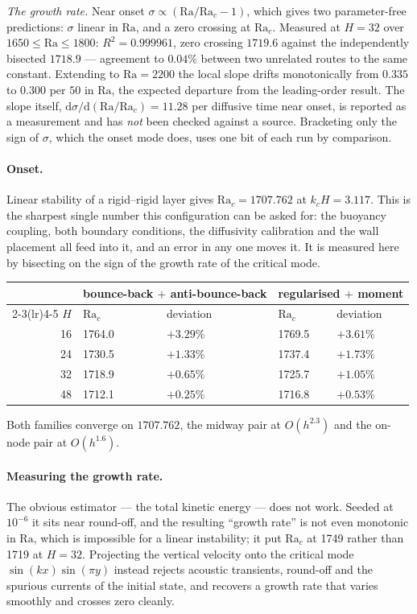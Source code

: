 \documentclass[11pt,a4paper]{article}
\begin{document}
\emph{The growth rate.} Near onset $\sigma\propto(\mathrm{Ra}/\mathrm{Ra}_c-1)$,
which gives two parameter-free predictions: $\sigma$ linear in $\mathrm{Ra}$,
and a zero crossing at $\mathrm{Ra}_c$. Measured at $H=32$ over
$1650\le\mathrm{Ra}\le1800$: $R^2=0.999961$, zero crossing $1719.6$ against the
independently bisected $1718.9$ --- agreement to $0.04\%$ between two unrelated
routes to the same constant. Extending to $\mathrm{Ra}=2200$ the local slope
drifts monotonically from $0.335$ to $0.300$ per $50$ in $\mathrm{Ra}$, the
expected departure from the leading-order result. The slope itself,
$\mathrm{d}\sigma/\mathrm{d}(\mathrm{Ra}/\mathrm{Ra}_c)=11.28$ per diffusive
time near onset, is reported as a measurement and has \emph{not} been checked
against a source. Bracketing only the sign of $\sigma$, which the onset mode
does, uses one bit of each run by comparison.

\paragraph{Onset.} Linear stability of a rigid--rigid layer gives
$\mathrm{Ra}_c = 1707.762$ at $k_cH = 3.117$. This is the sharpest single number
this configuration can be asked for: the buoyancy coupling, both boundary
conditions, the diffusivity calibration and the wall placement all feed into it,
and an error in any one moves it. It is measured here by bisecting on the sign of
the growth rate of the critical mode.
\begin{center}\small
\begin{tabular}{rllll}
\toprule
& \multicolumn{2}{c}{bounce-back $+$ anti-bounce-back} & \multicolumn{2}{c}{regularised $+$ moment} \\
\cmidrule(lr){2-3}\cmidrule(lr){4-5}
$H$ & $\mathrm{Ra}_c$ & deviation & $\mathrm{Ra}_c$ & deviation \\
\midrule
16 & 1764.0 & $+3.29\%$ & 1769.5 & $+3.61\%$ \\
24 & 1730.5 & $+1.33\%$ & 1737.4 & $+1.73\%$ \\
32 & 1718.9 & $+0.65\%$ & 1725.7 & $+1.05\%$ \\
48 & 1712.1 & $\bm{+0.25\%}$ & 1716.8 & $+0.53\%$ \\
\bottomrule
\end{tabular}
\end{center}
\noindent Both families converge on $1707.762$, the midway pair at
$O(h^{2.3})$ and the on-node pair at $O(h^{1.6})$.

\paragraph{Measuring the growth rate.} The obvious estimator --- the total
kinetic energy --- does not work. Seeded at $10^{-6}$ it sits near round-off, and
the resulting ``growth rate'' is not even monotonic in $\mathrm{Ra}$, which is
impossible for a linear instability; it put $\mathrm{Ra}_c$ at 1749 rather than
1719 at $H=32$. Projecting the vertical velocity onto the critical mode
$\sin(kx)\sin(\pi y)$ instead rejects acoustic transients, round-off and the
spurious currents of the initial state, and recovers a growth rate that varies
smoothly and crosses zero cleanly.
\end{document}
